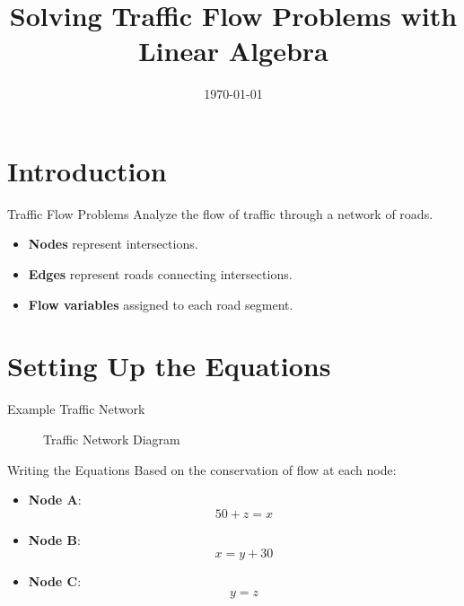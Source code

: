 \documentclass{beamer}
\title{Solving Traffic Flow Problems with Linear Algebra}
\date{\today}
\begin{document}
\begin{frame}
    \titlepage
\end{frame}

\section{Introduction}

\begin{frame}{Traffic Flow Problems}
    Analyze the flow of traffic through a network of roads.
    \begin{itemize}
        \item \textbf{Nodes} represent intersections.
        \item \textbf{Edges} represent roads connecting intersections.
        \item \textbf{Flow variables} assigned to each road segment.
    \end{itemize}
\end{frame}

\section{Setting Up the Equations}

\begin{frame}{Example Traffic Network}
    \begin{figure}
        \centering
        \caption{Traffic Network Diagram}
    \end{figure}
\end{frame}

\begin{frame}{Writing the Equations}
    Based on the conservation of flow at each node:
    \begin{itemize}
        \item \textbf{Node A}:
        \[
        50 + z = x
        \]
        \item \textbf{Node B}:
        \[
        x = y + 30
        \]
        \item \textbf{Node C}:
        \[
        y = z
        \]
    \end{itemize}
\end{frame}
\end{document}
